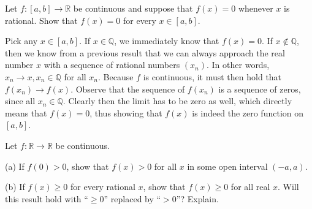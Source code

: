 \begin{exercise}{45}
    Let $f: [a, b] \rightarrow \mathbb{R}$ be continuous and suppose that $f(x) = 0$ whenever $x$ is rational. Show that $f(x) = 0$ for every $x \in [a,b]$.
\end{exercise}

\begin{solution}
    
    Pick any $x \in [a, b]$. If $x \in \mathbb{Q}$, we immediately know that $f(x) 
    = 0$.
    If $x \notin \mathbb{Q}$, then we know from a previous result that we can always approach the real number $x$ with a sequence of rational numbers $(x_n)$. 
    In other words, $x_n \rightarrow x, x_n \in \mathbb{Q}$ for all $x_n$.
    Because $f$ is continuous, it must then hold that $f(x_n) \rightarrow f(x)$. Observe that the sequence of $f(x_n)$ is a sequence of zeros, since all $x_n \in \mathbb{Q}$.
    Clearly then the limit has to be zero as well, which directly means that $f(x) = 0$, thus showing that $f(x)$ is indeed the zero function on $[a, b]$.
\end{solution}

\begin{exercise}{46}
    Let $f: \mathbb{R} \rightarrow \mathbb{R}$ be continuous.

    (a) If $f(0) > 0$, show that $f(x) > 0$ for all $x$ in some open interval $(-a, a)$.

    (b) If $f(x) \geq 0$ for every rational $x$, show that $f(x) \geq 0$ for all real $x$. 
    Will this result hold with ``$\geq 0$'' replaced by ``$> 0$''?
    Explain.
\end{exercise}

